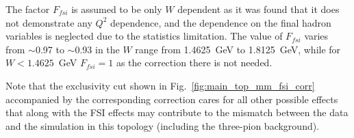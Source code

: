 The factor $F_{fsi}$ is assumed to be only $W$ dependent as it was found that it does not demonstrate any $Q^{2}$ dependence, and the dependence on the final hadron variables is neglected due to the statistics limitation. The value of $F_{fsi}$ varies from $\sim$0.97 to $\sim$0.93 in the $W$ range from 1.4625~GeV to 1.8125~GeV, while for $W < 1.4625$~GeV $F_{fsi}=1$ as the correction there is not needed.


Note that the exclusivity cut shown in Fig.~\ref{fig:main_top_mm_fsi_corr} accompanied by the corresponding correction cares for all other possible effects that along with the FSI effects may contribute to the mismatch between the data and the simulation in this topology (including the three-pion background).

